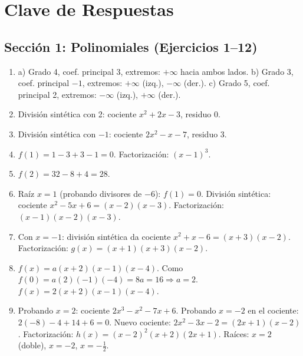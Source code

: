 \documentclass[12pt, a4paper]{article}
\begin{document}
\newpage

\section{Clave de Respuestas}

\subsection*{Sección 1: Polinomiales (Ejercicios 1--12)}

\begin{enumerate}[leftmargin=*, label=\textbf{\arabic*.}]
  \item a) Grado 4, coef. principal 3, extremos: $+\infty$ hacia ambos lados.
        \quad b) Grado 3, coef. principal $-1$, extremos: $+\infty$ (izq.), $-\infty$ (der.).
        \quad c) Grado 5, coef. principal 2, extremos: $-\infty$ (izq.), $+\infty$ (der.).

  \item División sintética con 2: cociente $x^2 + 2x - 3$, residuo 0.

  \item División sintética con $-1$: cociente $2x^2 - x - 7$, residuo 3.

  \item $f(1) = 1 - 3 + 3 - 1 = 0$. Factorización: $(x - 1)^3$.

  \item $f(2) = 32 - 8 + 4 = 28$.

  \item Raíz $x = 1$ (probando divisores de $-6$): $f(1) = 0$. División sintética: cociente $x^2 - 5x + 6 = (x - 2)(x - 3)$. Factorización: $(x - 1)(x - 2)(x - 3)$.

  \item Con $x = -1$: división sintética da cociente $x^2 + x - 6 = (x + 3)(x - 2)$. Factorización: $g(x) = (x + 1)(x + 3)(x - 2)$.

  \item $f(x) = a(x + 2)(x - 1)(x - 4)$. Como $f(0) = a(2)(-1)(-4) = 8a = 16 \Rightarrow a = 2$. $f(x) = 2(x + 2)(x - 1)(x - 4)$.

  \item Probando $x = 2$: cociente $2x^3 - x^2 - 7x + 6$. Probando $x = -2$ en el cociente: $2(-8) - 4 + 14 + 6 = 0$. Nuevo cociente: $2x^2 - 3x - 2 = (2x + 1)(x - 2)$. Factorización: $h(x) = (x - 2)^2 (x + 2)(2x + 1)$. Raíces: $x = 2$ (doble), $x = -2$, $x = -\frac{1}{2}$.


\end{enumerate}
\end{document}
